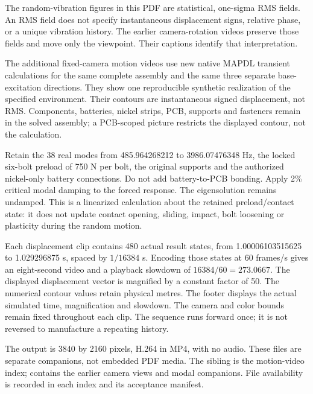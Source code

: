 The random-vibration figures in this PDF are statistical, one-sigma RMS fields. An RMS field does not specify instantaneous displacement signs, relative phase, or a unique vibration history. The earlier camera-rotation videos preserve those fields and move only the viewpoint. Their captions identify that interpretation.

The additional fixed-camera motion videos use new native MAPDL transient calculations for the same complete assembly and the same three separate base-excitation directions. They show one reproducible synthetic realization of the specified environment. Their contours are instantaneous signed displacement, not RMS. Components, batteries, nickel strips, PCB, supports and fasteners remain in the solved assembly; a PCB-scoped picture restricts the displayed contour, not the calculation.

Retain the 38 real modes from 485.964268212 to 3986.07476348 Hz, the locked six-bolt preload of 750 N per bolt, the original supports and the authorized nickel-only battery connections. Do not add battery-to-PCB bonding. Apply 2\% critical modal damping to the forced response. The eigensolution remains undamped. This is a linearized calculation about the retained preload/contact state: it does not update contact opening, sliding, impact, bolt loosening or plasticity during the random motion.

Each displacement clip contains 480 actual result states, from 1.00006103515625 to 1.029296875 s, spaced by $1/16384$ s. Encoding those states at 60 frames/s gives an eight-second video and a playback slowdown of $16384/60=273.0667$. The displayed displacement vector is magnified by a constant factor of 50. The numerical contour values retain physical metres. The footer displays the actual simulated time, magnification and slowdown. The camera and color bounds remain fixed throughout each clip. The sequence runs forward once; it is not reversed to manufacture a repeating history.

The output is 3840 by 2160 pixels, H.264 in MP4, with no audio. These files are separate companions, not embedded PDF media. The sibling  is the motion-video index;  contains the earlier camera views and modal companions. File availability is recorded in each index and its acceptance manifest.


